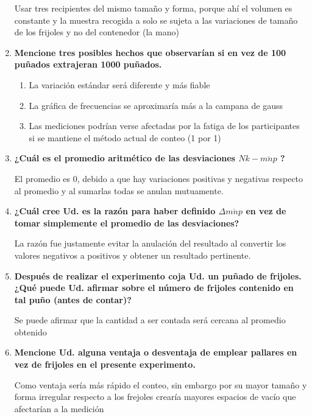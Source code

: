 \begin{enumerate}
	      Usar tres recipientes del mismo tamaño y forma, porque ahí el volumen es constante y la muestra recogida a solo se sujeta a las variaciones de tamaño de los frijoles y no del contenedor (la mano)
	\item \textbf{Mencione tres posibles hechos que observarían si en vez de 100 puñados
		      extrajeran 1000 puñados.}

	      \begin{enumerate}
		      \item  La variación estándar será diferente y más fiable
		      \item La gráfica de frecuencias se aproximaría más a la campana de gauss
		      \item Las mediciones podrían verse afectadas por la fatiga de los participantes si se mantiene el método actual de conteo (1 por 1)
	      \end{enumerate}
	\item \textbf{¿Cuál es el promedio aritmético de las desviaciones $Nk - \overline{mnp}$ ?}

	      El promedio es 0, debido a que hay variaciones positivas y negativas respecto al promedio y al sumarlas todas se anulan mutuamente.
	\item \textbf{¿Cuál cree Ud. es la razón para haber definido $\Delta \overline{mnp}$ en vez de tomar
		      simplemente el promedio de las desviaciones?}

	      La razón fue justamente evitar la anulación del resultado al convertir los valores negativos a positivos y obtener un resultado pertinente.
	\item \textbf{Después de realizar el experimento coja Ud. un puñado de frijoles. ¿Qué puede
		      Ud. afirmar sobre el número de frijoles contenido en tal puño (antes de contar)?}

	      Se puede afirmar que la cantidad a ser contada será cercana al promedio obtenido
	\item \textbf{Mencione Ud. alguna ventaja o desventaja de emplear pallares en vez de
		      frijoles en el presente experimento.}

	      Como ventaja sería más rápido el conteo, sin embargo por su mayor tamaño y forma irregular respecto a los frejoles crearía mayores espacios de vacío que afectarían a la medición
\end{enumerate}
